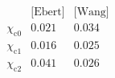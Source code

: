 $$
\begin{array}{c|cc}
 \text{} & \text{[Ebert]} & \text{[Wang]} \\
\hline
 \chi_{\text{c0}} & 0.021 & 0.034 \\
 \chi_{\text{c1}} & 0.016 & 0.025 \\
 \chi_{\text{c2}} & 0.041 & 0.026 \\
\end{array}$$
